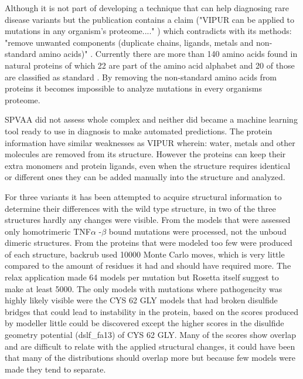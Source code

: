 Although it is not part of developing a technique that can help diagnosing rare disease variants but the publication contains a claim ("VIPUR can be applied to mutations in any organism’s proteome...." \cite{baugh_robust_2016}) which contradicts with its methods: "remove unwanted components (duplicate chains, ligands, metals and non-standard amino acids)" \cite{baugh_robust_2016}. Currently there are more than 140 amino acids found in natural proteins of which 22 are part of the amino acid alphabet and 20 of those are classified as standard \cite{ambrogelly_natural_2007}. By removing the non-standard amino acids from proteins it becomes impossible to analyze mutations in every organisms proteome.

SPVAA did not assess whole complex and neither did became a machine learning tool ready to use in diagnosis to make automated predictions. The protein information have similar weaknesses as VIPUR wherein: water, metals and other molecules are removed from its structure. However the proteins can keep their extra monomers and protein ligands, even when the structure requires identical or different ones they can be added manually into the structure and analyzed. 

For three variants it has been attempted to acquire structural information to determine their differences with the wild type structure, in two of the three structures hardly any changes were visible. From the models that were assessed only homotrimeric TNF$\alpha$ -$\beta$ bound mutations were processed, not the unboud dimeric structures. From the proteins that were modeled too few were produced of each structure, backrub used 10000 Monte Carlo moves, which is very little compared to the amount of residues it had and should have required more. The relax application made 64 models per mutation but Rosetta itself suggest to make at least 5000\cite{rosetta_commons_analyzing_nodate}.
The only models with mutations where pathogencity was highly likely visible were the CYS 62 GLY models that had broken disulfide bridges that could lead to instability in the protein, based on the scores produced by modeller little could be discovered except the higher scores in the disulfide geometry potential (dslf\_fa13) of CYS 62 GLY. Many of the scores show overlap and are difficult to relate with the applied structural changes, it could have been that many of the distributions should overlap more but because few models were made they tend to separate.

